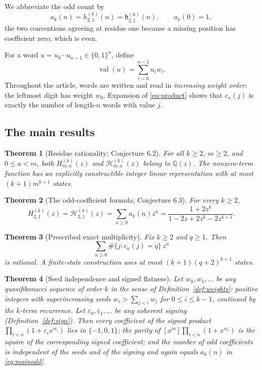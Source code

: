 \documentclass[11pt,letterpaper]{article}
\numberwithin{equation}{section}
\newtheorem{theorem}{Theorem}[section]
\theoremstyle{definition}
\theoremstyle{remark}
\newcommand{\Q}{\mathbb Q}
\newcommand{\val}{\operatorname{val}}
\newcommand{\eps}{\varepsilon}
\newcommand{\cH}{\mathcal H}
\newcommand{\coef}[2]{[x^{#1}]#2}
\begin{document}
We abbreviate the odd count by
\begin{equation}
 a_k(n)=h_{2,1}^{(k)}(n)=\mathfrak h_{2,1}^{(k)}(n),
 \qquad a_k(0)=1,
 \label{eq:ak}
\end{equation}
the two conventions agreeing at residue one because a missing position has
coefficient zero, which is even.

For a word $u=u_0\cdots u_{n-1}\in\{0,1\}^n$, define
\begin{equation}
 \val(u)=\sum_{i=0}^{n-1}u_iw_i.
 \label{eq:value}
\end{equation}
Throughout the article, words are written and read in \emph{increasing
weight order}: the leftmost digit has weight $w_0$. Expansion of
\eqref{eq:product} shows that $c_n(j)$ is exactly the number of length-$n$
words with value $j$.

\subsection{The main results}

\begin{theorem}[Residue rationality; Conjecture 6.2]
\label{thm:mainrat}
For all $k\ge2$, $m\ge2$, and $0\le a<m$, both
$H_{m,a}^{(k)}(z)$ and $\cH_{m,a}^{(k)}(z)$ belong to $\Q(z)$.
The nonzero-term function has an explicitly constructible integer
linear representation with at most $(k+1)m^{k+1}$ states.
\end{theorem}

\begin{theorem}[The odd-coefficient formula; Conjecture 6.3]
\label{thm:mainodd}
For every $k\ge2$,
\begin{equation}
 \boxed{\displaystyle
 H_{2,1}^{(k)}(z)=\cH_{2,1}^{(k)}(z)=\sum_{n\ge0}a_k(n)z^n
 =\frac{1+2z^k}{1-2z+2z^k-2z^{k+1}}.}
 \label{eq:mainodd}
\end{equation}
\end{theorem}

\begin{theorem}[Prescribed exact multiplicity]
\label{thm:mainexact}
Fix $k\ge2$ and $q\ge1$. Then
\[
 \sum_{n\ge0}\#\{j:c_n(j)=q\}\,z^n
\]
is rational. A finite-state construction uses at most
$(k+1)(q+2)^{k+1}$ states.
\end{theorem}

\begin{theorem}[Seed independence and signed flatness]
\label{thm:seedmain}
Let $w_0,w_1,\ldots$ be any \emph{quasifibonacci sequence of order $k$}
in the sense of Definition~\ref{def:weights}: positive integers with
superincreasing seeds $w_i>\sum_{j<i}w_j$ for $0\le i\le k-1$, continued by
the $k$-term recurrence. Let $\eps_0,\eps_1,\ldots$ be any coherent signing
(Definition~\ref{def:sign}). Then every coefficient of the signed product
$\prod_{i<n}(1+\eps_ix^{w_i})$ lies in $\{-1,0,1\}$; the parity of
$\coef{m}{\prod_{i<n}(1+x^{w_i})}$ is the square of the corresponding signed
coefficient; and the number of odd coefficients is independent of the seeds
and of the signing and again equals $a_k(n)$ in \eqref{eq:mainodd}.
\end{theorem}
\end{document}
